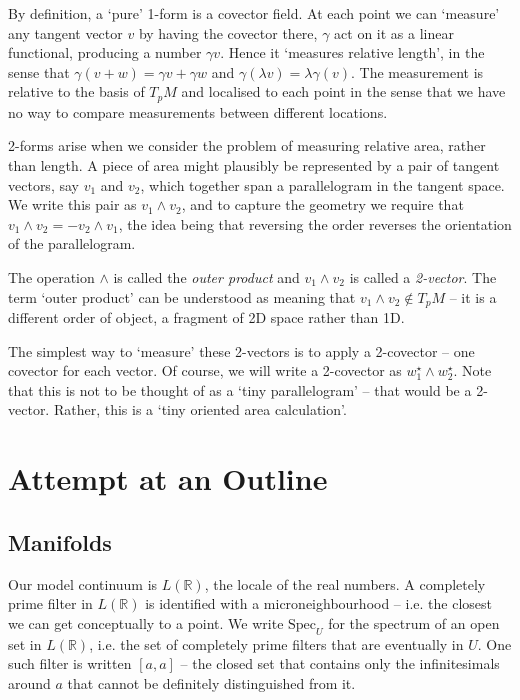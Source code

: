 \documentclass[oneside,english]{amsbook}
\numberwithin{section}{chapter}
\theoremstyle{plain}
\theoremstyle{definition}
\begin{document}
By definition, a `pure' 1-form is a covector field. At each point we can `measure' any tangent vector $v$ by having the covector there, $\gamma$ act on it as a linear functional, producing a number $\gamma v$. Hence it `measures relative length', in the sense that $\gamma (v + w) = \gamma v + \gamma w$ and $\gamma (\lambda v) = \lambda\gamma(v)$. The measurement is relative to the basis of $T_p M$ and localised to each point in the sense that we have no way to compare measurements between different locations.

2-forms arise when we consider the problem of measuring relative area, rather than length. A piece of area might plausibly be represented by a pair of tangent vectors, say $v_1$ and $v_2$, which together span a parallelogram in the tangent space. We write this pair as $v_1\land v_2$, and to capture the geometry we require that $v_1\land v_2 = -v_2\land v_1$, the idea being that reversing the order reverses the orientation of the parallelogram. 

The operation $\land$ is called the \emph{outer product} and $v_1\land v_2$ is called a \emph{2-vector}. The term `outer product' can be understood as meaning that $v_1\land v_2\notin T_p M$ -- it is a different order of object, a fragment of 2D space rather than 1D.

The simplest way to `measure' these 2-vectors is to apply a 2-covector -- one covector for each vector. Of course, we will write a 2-covector as $w_1^\star\land w_2^\star$. Note that this is not to be thought of as a `tiny parallelogram' -- that would be a 2-vector. Rather, this is a `tiny oriented area calculation'.  

\chapter*{Attempt at an Outline}

\section{Manifolds}

Our model continuum is $L(\mathbb{R})$, the locale of the real numbers. A completely prime filter in $L(\mathbb{R})$ is identified with a microneighbourhood -- i.e. the closest we can get conceptually to a point. We write $\text{Spec}_U$ for the spectrum of an open set in $L(\mathbb{R})$, i.e. the set of completely prime filters that are eventually in $U$. One such filter is written $[a, a]$ -- the closed set that contains only the infinitesimals around $a$ that cannot be definitely distinguished from it.
\end{document}
